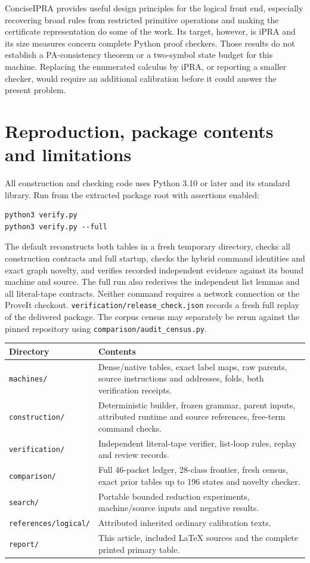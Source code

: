 \documentclass[11pt,letterpaper]{article}
\newcommand{\file}[1]{\texttt{\nolinkurl{#1}}}
\begin{document}
ConciseIPRA provides useful design principles for the logical front end,
especially recovering broad rules from restricted primitive operations
and making the certificate representation do some of the work. Its
target, however, is iPRA and its size measures concern complete Python
proof checkers. Those results do not establish a PA-consistency theorem
or a two-symbol state budget for this machine. Replacing the enumerated
calculus by iPRA, or reporting a smaller checker, would require an
additional calibration before it could answer the present problem.

\section{Reproduction, package contents and limitations}

All construction and checking code uses Python 3.10 or later and its
standard library. Run from the extracted package root with assertions
enabled:
\begin{verbatim}
python3 verify.py
python3 verify.py --full
\end{verbatim}
The default reconstructs both tables in a fresh temporary directory,
checks all construction contracts and full startup, checks the hybrid
command identities and exact graph novelty, and verifies recorded
independent evidence against its bound machine and source. The full run
also rederives the independent list lemmas and all literal-tape contracts.
Neither command requires a network connection or the ProveIt checkout.
\file{verification/release_check.json} records a fresh full replay of
the delivered package. The corpus census may separately be rerun against
the pinned repository using \file{comparison/audit_census.py}.

\begin{center}\small
\begin{tabularx}{\linewidth}{@{}lX@{}}\toprule
Directory & Contents\\\midrule
\file{machines/} & Dense/native tables, exact label maps, raw parents, source instructions and addresses, folds, both verification receipts.\\
\file{construction/} & Deterministic builder, frozen grammar, parent inputs, attributed runtime and source references, free-term command checks.\\
\file{verification/} & Independent literal-tape verifier, list-loop rules, replay and review records.\\
\file{comparison/} & Full 46-packet ledger, 28-class frontier, fresh census, exact prior tables up to 196 states and novelty checker.\\
\file{search/} & Portable bounded reduction experiments, machine/source inputs and negative results.\\
\file{references/logical/} & Attributed inherited ordinary calibration texts.\\
\file{report/} & This article, included LaTeX sources and the complete printed primary table.\\\bottomrule
\end{tabularx}
\end{center}
\end{document}
